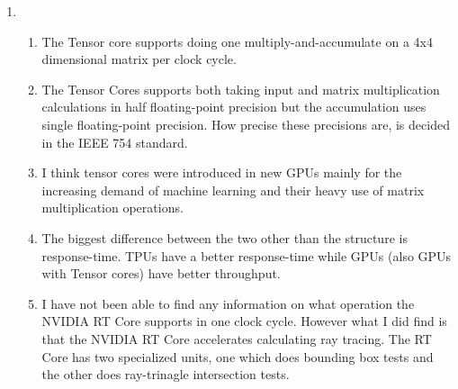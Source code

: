 \documentclass[a4paper, 12pt]{article}
\begin{document}
\begin{enumerate}
	\item
	\begin{enumerate}
		\item The Tensor core supports doing one multiply-and-accumulate on a 4x4 dimensional matrix per clock cycle.
		
		\item The Tensor Cores supports both taking input and matrix multiplication calculations in half floating-point precision but the accumulation uses single floating-point precision. How precise these precisions are, is decided in the IEEE 754 standard.
		
		\item I think tensor cores were introduced in new GPUs mainly for the increasing demand of machine learning and their heavy use of matrix multiplication operations.
		
		
		
		\item The biggest difference between the two other than the structure is response-time. TPUs have a better response-time while GPUs (also GPUs with Tensor cores) have better throughput.
		
		

		\item I have not been able to find any information on what operation the NVIDIA RT Core supports in one clock cycle. However what I did find is that the NVIDIA RT Core accelerates calculating ray tracing. The RT Core has two specialized units, one which does bounding box tests and the other does ray-trinagle intersection tests.
	\end{enumerate}


\end{enumerate}
\end{document}
